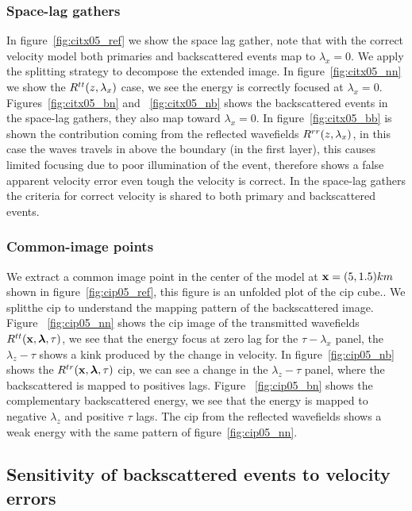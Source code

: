\subsubsection{Space-lag gathers}

In figure~\ref{fig:citx05_ref} we show the space lag gather, note that with the correct velocity model both primaries and
backscattered events map to $\lambda_x=0$. We apply the splitting strategy to decompose the extended image. In figure~\ref{fig:citx05_nn}
we show the $R^{tt}(z,\lambda_x)$ case, we see the energy is correctly focused at $\lambda_x=0$. Figures~\ref{fig:citx05_bn} and ~\ref{fig:citx05_nb}
shows the backscattered events in the space-lag gathers, they also map toward $\lambda_x=0$. In figure~\ref{fig:citx05_bb} is shown
the contribution coming from the reflected wavefields $R^{rr}(z,\lambda_x)$, in this case the waves travels in above the boundary (in the first layer),
this causes limited focusing due to poor illumination of the event, therefore shows a false apparent velocity error even tough the velocity
is correct. In the space-lag gathers the criteria for correct velocity is shared to both primary and backscattered events.

\subsubsection{Common-image points}

We extract a common image point in the center of the model at ${\bf x}=(5,1.5)km$ shown in figure~\ref{fig:cip05_ref}, this figure 
is an unfolded plot of the cip cube.. We splitthe cip to understand the mapping pattern of the backscattered image. Figure
~\ref{fig:cip05_nn} shows the cip image of the transmitted wavefields $R^{tt}({\bf x},{\boldsymbol{\lambda}},\tau)$, we see that the energy focus at zero lag 
for the $\tau-\lambda_x$ panel, the $\lambda_z-\tau$ shows a kink produced by the change in velocity. In figure~\ref{fig:cip05_nb}
 shows the $R^{tr}({\bf x},{\boldsymbol{\lambda}},\tau)$ cip, we can see a change in the $\lambda_z-\tau$ panel, where the backscattered is mapped to positives lags. Figure
~\ref{fig:cip05_bn} shows the complementary backscattered energy, we see that the energy is mapped to negative $\lambda_z$ and positive $\tau$ lags.
The cip from the reflected wavefields shows a weak energy with the same pattern of figure~\ref{fig:cip05_nn}.

\subsection{Sensitivity of backscattered events to velocity errors}

